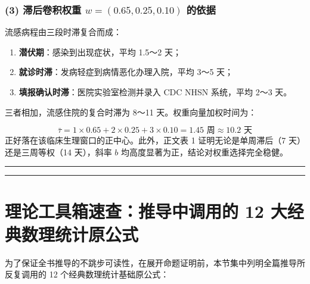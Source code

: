 \documentclass[11pt,a4paper]{ctexart}
\begin{document}
\subsubsection{(3) 滞后卷积权重 $w = (0.65, 0.25, 0.10)$ 的依据}
流感病程由三段时滞复合而成：

\begin{enumerate}[leftmargin=2em, itemsep=2pt, parsep=0pt]
\item \textbf{潜伏期}：感染到出现症状，平均 1.5～2 天；
\item \textbf{就诊时滞}：发病轻症到病情恶化办理入院，平均 3～5 天；
\item \textbf{填报确认时滞}：医院实验室检测并录入 CDC NHSN 系统，平均 2～3 天。
\end{enumerate}
三者相加，流感住院的复合时滞为 8～11 天。权重向量加权时间为：

\[
\bar{\tau} = 1 \times 0.65 + 2 \times 0.25 + 3 \times 0.10 = 1.45 \text{ 周} \approx 10.2 \text{ 天}
\]
正好落在该临床生理窗口的正中心。此外，正文表 1 证明无论是单周滞后（7 天）还是三周等权（14 天），斜率 $b$ 均高度显著为正，结论对权重选择完全稳健。


\vspace{0.8em}\hrule\vspace{0.8em}

\vspace{0.8em}\hrule\vspace{0.8em}

\section{理论工具箱速查：推导中调用的 12 大经典数理统计原公式}

为了保证全书推导的不跳步可读性，在展开命题证明前，本节集中列明全篇推导所反复调用的 12 个经典数理统计基础原公式：
\end{document}
